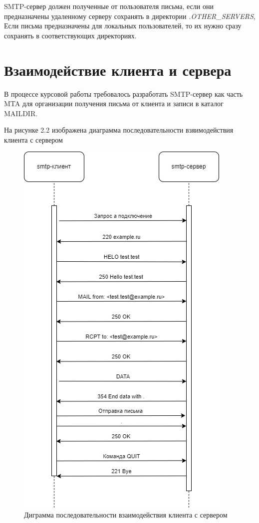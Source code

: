 \documentclass[a4paper,12pt]{report}
\begin{document}
	SMTP-сервер должен полученные от пользователя письма, если они предназначены удаленному серверу сохранять в директории \textit{.OTHER\_SERVERS}, 
	Если письма предназначены для локальных пользователей, то их нужно сразу сохранять в соответствующих директориях.
	

	\section{Взаимодействие клиента и сервера}

	В процессе курсовой работы требовалось разработать SMTP-сервер как часть MTA 
	для организации получения письма от клиента и записи в каталог MAILDIR. 

	На рисунке 2.2 изображена диаграмма последовательности взяимодействия клиента с сервером
	\begin{figure}
		\centering
		\includegraphics[scale = 2]{diagram.png}
		\caption{Диграмма последовательности взаимодействия клиента с сервером} 
	\end{figure}
\end{document}
